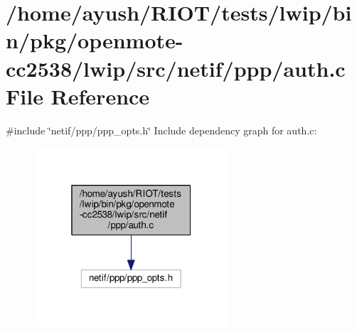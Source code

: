 \hypertarget{openmote-cc2538_2lwip_2src_2netif_2ppp_2auth_8c}{}\section{/home/ayush/\+R\+I\+O\+T/tests/lwip/bin/pkg/openmote-\/cc2538/lwip/src/netif/ppp/auth.c File Reference}
\label{openmote-cc2538_2lwip_2src_2netif_2ppp_2auth_8c}
{\ttfamily \#include \char`\"{}netif/ppp/ppp\+\_\+opts.\+h\char`\"{}}\newline
Include dependency graph for auth.\+c\+:
\nopagebreak
\begin{figure}[H]
\begin{center}
\leavevmode
\includegraphics[width=205pt]{openmote-cc2538_2lwip_2src_2netif_2ppp_2auth_8c__incl}
\end{center}
\end{figure}
